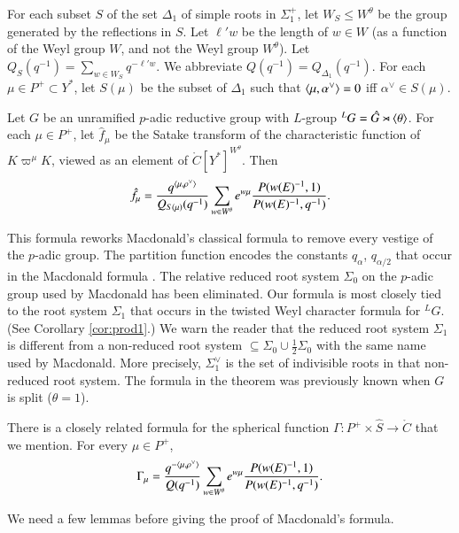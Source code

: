 For each subset $S$
of the set $\Delta_1$ of simple  roots in $\Sigma^+_1$,
 let $W_S\le W^\theta$ be the group generated by the reflections in $S$.
Let $\ell' w$ be the length of $w\in W$ (as a function of the Weyl group $W$, and not the Weyl group $W^\theta$).
Let $Q_S(q^{-1}) = \sum_{w\in W_S} q^{-\ell'w}$.  We abbreviate $Q(q^{-1}) = Q_{\Delta_1}(q^{-1})$.
For each $\mu\in P^+\subset Y^*$, let $S(\mu)$ be the subset of $\Delta_1$ such that $\langle{\mu,\alpha^\vee}\rangle=0$ iff $\alpha^\vee\in S(\mu)$.

\begin{theorem}\label{thm:macdonald}
Let $G$ be an unramified $p$-adic reductive group with $L$-group ${}^LG = \hat G \rtimes \langle{\theta}\rangle$.
For each $\mu\in P^+$, 
let $\hat f_\mu$ be the Satake transform of the characteristic function of $K\varpi^\mu K$, viewed as an element
of $\ring{C}[Y^*]^{W^\theta}$.  Then
\[
\hat f_\mu = \frac{q^{\langle{\mu,\rho^\vee}\rangle}}{ Q_{S(\mu)}(q^{-1})} \sum_{w\in W^\theta} e^{w\mu} \frac{P(w(E)^{-1},1)}{P(w(E)^{-1},q^{-1})}.
\]
\end{theorem}

This formula reworks Macdonald's classical formula  to remove every vestige
of the $p$-adic group.
The partition function
encodes the constants $q_\alpha$, $q_{\alpha/2}$ that occur in the Macdonald formula \cite{macdonaldspherical}.  
The relative reduced root system $\Sigma_0$ on the $p$-adic group used by Macdonald has been eliminated.  
Our formula is most closely
tied to the root system $\Sigma_1$ that occurs in the twisted Weyl character formula for ${}^LG$.  (See Corollary \ref{cor:prod1}.)  
We warn the reader that the reduced root system $\Sigma_1$
is different from a non-reduced root system $\subseteq \Sigma_0 \cup \frac{1}{2}\Sigma_0$ 
with the same name used by Macdonald.  More precisely, 
$\Sigma_1^\vee$ is the set of indivisible roots in that non-reduced root system.
The formula in the theorem was previously known when $G$ is split  ($\theta=1$).

There is a closely related formula for the spherical function $\Gamma:P^+\times\hat S\to\ring{C}$ that we mention.
For every $\mu\in P^+$, 
\begin{equation} 
\Gamma_\mu = 
\frac{q^{-\langle{\mu,\rho^\vee}\rangle}}{ Q(q^{-1})} \sum_{w\in W^\theta} e^{w\mu} \frac{P(w(E)^{-1},1)}{P(w(E)^{-1},q^{-1})}.
\end{equation}


We need a few lemmas before giving the proof of Macdonald's
formula.

